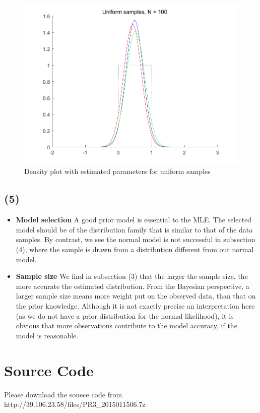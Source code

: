\documentclass{article}
\begin{document}
{{        \begin{figure}[H]
            \centering
            \includegraphics[width = 0.6\linewidth]{uniform_100.png}
            \caption{Density plot with estimated parameters for uniform samples}
        \end{figure}
    }

    \subsection*{(5)}
    {
        \begin{itemize}
            \item \textbf{Model selection} \quad A good prior model is essential to the MLE. The selected model should be of the distribution family that is similar to that of the data samples. By contrast, we see the normal model is not successful in subsection (4), where the sample is drawn from a distribution different from our normal model.

            \item \textbf{Sample size} \quad We find in subsection (3) that the larger the sample size, the more accurate the estimated distribution. From the Bayesian perspective, a larger sample size means more weight put on the observed data, than that on the prior knowledge. Although it is not exactly precise an interpretation here (as we do not have a prior distribution for the normal likelihood), it is obvious that more observations contribute to the model accuracy, if the model is reasonable.

        \end{itemize}
    }
}

\section*{Source Code}
{
    Please download the souece code from http://39.106.23.58/files/PR3\_2015011506.7z
}

\clearpage
\end{document}
